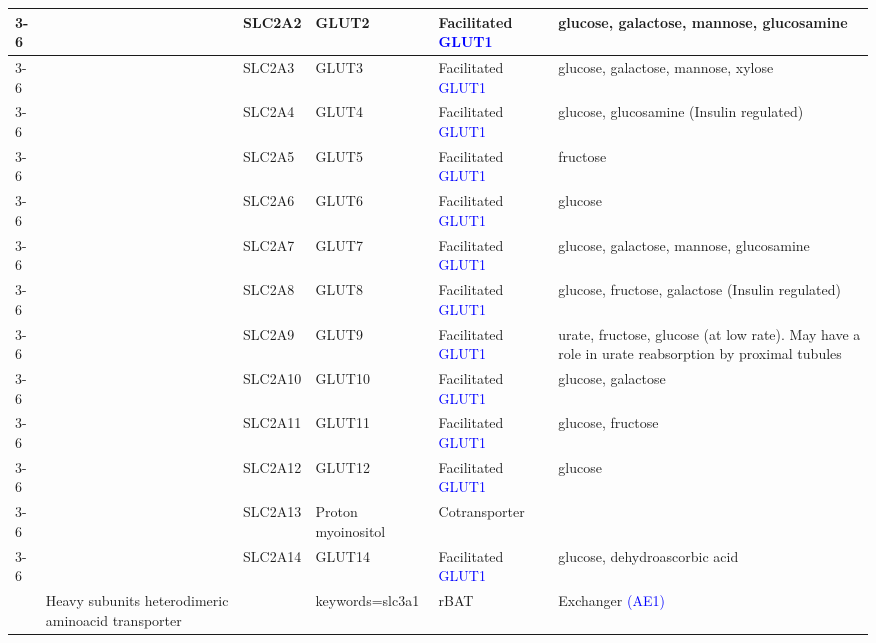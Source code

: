 \documentclass[12pt]{report}
\begin{document}
\begin{center}
\begin{longtable}{|p{1.5cm}|p{3.2cm}|p{1.9cm}|p{1.65cm}|p{3cm}|p{3cm}|}
\cline{3-6}
&&SLC2A2& GLUT2 & Facilitated \textcolor{blue}{GLUT1 \cite{colville1993kinetic}} & glucose, galactose, mannose, glucosamine\\ 
\cline{3-6}
&&SLC2A3& GLUT3 & Facilitated \textcolor{blue}{GLUT1 \cite{colville1993kinetic}} &  glucose, galactose, mannose, xylose\\ 
\cline{3-6}
&&SLC2A4& GLUT4 & Facilitated \textcolor{blue}{GLUT1 \cite{stockli2010muscling,vargas2019physiology,huang2007glut4}} & glucose, glucosamine (Insulin regulated)\\ 
\cline{3-6}
&&SLC2A5& GLUT5 & Facilitated \textcolor{blue}{GLUT1 \cite{nomura2015structure,wright20121583}} & fructose\\ 
\cline{3-6}
&&SLC2A6& GLUT6 & Facilitated \textcolor{blue}{GLUT1 \cite{mizuno2011ubiquitination,Byrne2018GLUT6}} & glucose\\ 
\cline{3-6}
&&SLC2A7& GLUT7 & Facilitated \textcolor{blue}{GLUT1 \cite{cheeseman2008glut7,li2004cloning}} & glucose, galactose, mannose, glucosamine\\
\cline{3-6}
&& SLC2A8 & GLUT8 & Facilitated \textcolor{blue}{GLUT1 \cite{doege2000glut8,debosch2014glucose,carayannopoulos2000glut8}} &  glucose, fructose, galactose (Insulin regulated)\\ 
\cline{3-6}
&&SLC2A9& GLUT9 & Facilitated \textcolor{blue}{GLUT1 \cite{kimura2014expression,ebert2017reassessment,bu2017hormonal,bi2018glut9}}& urate, fructose, glucose (at low rate). May have a role in urate reabsorption by proximal tubules\\
\cline{3-6}
&&SLC2A10& GLUT10 & Facilitated \textcolor{blue}{GLUT1 \cite{segade2010glucose,pezzulo2011glucose,gamberucci2017glut10,syu2018glut10}}& glucose, galactose\\ 
\cline{3-6}
&&SLC2A11& GLUT11 & Facilitated \textcolor{blue}{GLUT1 \cite{doege2001characterization,gaster2004glut11,scheepers2005characterization}}& glucose, fructose\\ 
\cline{3-6}
&&SLC2A12& GLUT12 & Facilitated \textcolor{blue}{GLUT1 \cite{waller2011glut,matsuzaka2012glut12,waller2013glut12}} & glucose\\ 
\cline{3-6}
&&SLC2A13& Proton myoinositol & Cotransporter&\\ 
\cline{3-6}
&&SLC2A14& GLUT14 & Facilitated \textcolor{blue}{GLUT1 \cite{wu2002glut14,amir2017slc2a14}}& glucose, dehydroascorbic acid\\ 
\hline
\pagebreak
\multirow{4}{*}{\textbf{SLC3}} & \multirow{4}{4cm}{Heavy subunits heterodimeric aminoacid transporter\cite{fotiadis2013slc3,chillaron1996SLC3}} &\href{https://www.genecards.org/cgi-bin/carddisp.pl?gene=SLC3A1&keywords=slc3a1}{SLC3A1} & rBAT & Exchanger \textcolor{blue}{(AE1)\cite{chillaron1996SLC3}}&\\

\end{longtable}
\end{center}
\end{document}

